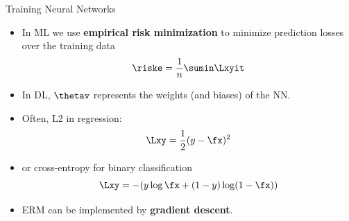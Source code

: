 \documentclass[11pt,compress,t,notes=noshow, xcolor=table]{beamer}
\begin{document}

\begin{vbframe}{Training Neural Networks}


\begin{itemize}
\item
In ML we use \textbf{empirical risk minimization} to minimize prediction 
losses over the training data
$$\riske = \frac{1}{n} \sumin \Lxyit$$
\item In DL, $\thetav$ represents the weights (and biases) of the NN. 
\item Often, L2 in regression:
$$\Lxy = \frac{1}{2}(y - \fx)^2$$
\item or cross-entropy for binary classification
$$\Lxy = - (y \log \fx + (1 - y) \log(1 - \fx))$$
 \item ERM can be implemented by \textbf{gradient descent}.
\end{itemize}
\end{vbframe}

\end{document}
